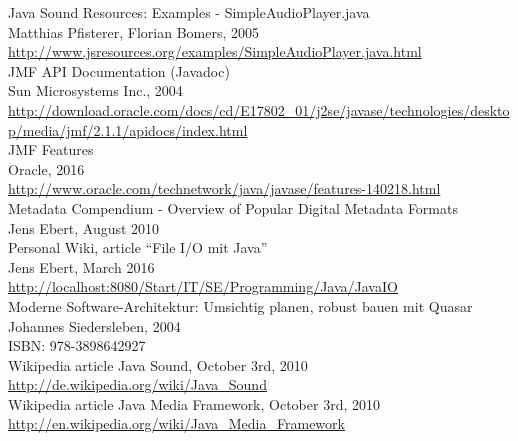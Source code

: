 \begin{thebibliography}{9999999999999}

	 Java Sound Resources: Examples - SimpleAudioPlayer.java\\
	Matthias Pfisterer, Florian Bomers, 2005\\
	\url{http://www.jsresources.org/examples/SimpleAudioPlayer.java.html}\\

	 JMF API Documentation (Javadoc)\\
	Sun Microsystems Inc., 2004\\
	\url{http://download.oracle.com/docs/cd/E17802_01/j2se/javase/technologies/desktop/media/jmf/2.1.1/apidocs/index.html}\\

	 JMF Features \\
	Oracle, 2016\\
	\url{http://www.oracle.com/technetwork/java/javase/features-140218.html}\\

	 Metadata Compendium - Overview of Popular Digital Metadata Formats\\
	Jens Ebert, August 2010\\
	
	 Personal Wiki, article ``File I/O mit Java''\\
	Jens Ebert, March 2016\\
	\url{http://localhost:8080/Start/IT/SE/Programming/Java/JavaIO}\\
	
	 Moderne Software-Architektur: Umsichtig planen, robust bauen mit Quasar\\
	Johannes Siedersleben, 2004\\
	ISBN: 978-3898642927\\

	 Wikipedia article Java Sound, October 3rd, 2010\\
	\url{http://de.wikipedia.org/wiki/Java_Sound}\\
	
	 Wikipedia article Java Media Framework, October 3rd, 2010\\
	\url{http://en.wikipedia.org/wiki/Java_Media_Framework}\\


\end{thebibliography}
